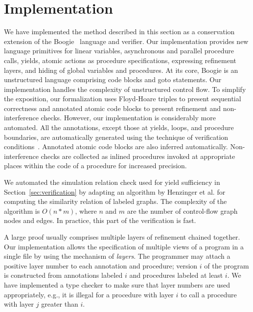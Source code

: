 \section{Implementation}
\label{sec:implementation}

We have implemented the method described in this section as a conservation extension 
of the Boogie~\cite{BarnettCDJL05} language and verifier.
Our implementation provides new language primitives for linear variables, asynchronous and parallel procedure calls, 
yields, atomic actions as procedure specifications, expressing refinement layers, and hiding of global variables and procedures.
At its core, Boogie is an unstructured language comprising code blocks and goto statements.
Our implementation handles the complexity of unstructured control flow.
To simplify the exposition, our formalization uses Floyd-Hoare triples to present sequential correctness and 
annotated atomic code blocks to present refinement and non-interference checks.
However, our implementation is considerably more automated.  
All the annotations, except those at yields, loops, and procedure boundaries, are automatically generated 
using the technique of verification conditions~\cite{BL05}.
Annotated atomic code blocks are also inferred automatically.
Non-interference checks are collected as inlined procedures
invoked at appropriate places within the code of a procedure for increased precision.

We automated the simulation relation check used for yield sufficiency in Section~\ref{sec:verification} 
by adapting an algorithm by Henzinger et al.\cite{HenzingerHK95} for computing the similarity relation of 
labeled graphs.
The complexity of the algorithm is $O(n*m)$, where $n$ and $m$ are the number of control-flow graph nodes and edges.
In practice, this part of the verification is fast.

A large proof usually comprises multiple layers of refinement chained together.
Our implementation allows the specification of multiple views of a program in a single file by using the mechanism of {\em layers}.
The programmer may attach a positive layer number to each annotation and procedure; 
version $i$ of the program is constructed from annotations labeled $i$ and procedures labeled at least $i$.
We have implemented a type checker to make sure that layer numbers are used appropriately, e.g., 
it is illegal for a procedure with layer $i$ to call a procedure with layer $j$ greater than $i$.
